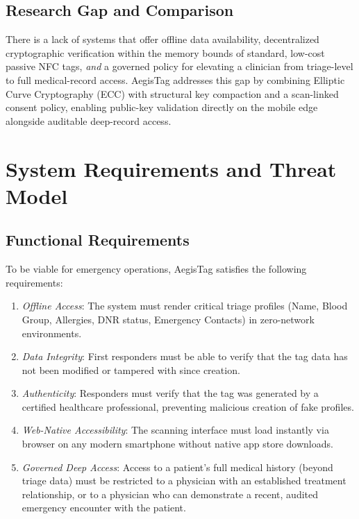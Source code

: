 \documentclass[conference]{IEEEtran}
\begin{document}
\subsection{Research Gap and Comparison}
There is a lack of systems that offer offline data availability, decentralized cryptographic verification within the memory bounds of standard, low-cost passive NFC tags, \textit{and} a governed policy for elevating a clinician from triage-level to full medical-record access. AegisTag addresses this gap by combining Elliptic Curve Cryptography (ECC) with structural key compaction and a scan-linked consent policy, enabling public-key validation directly on the mobile edge alongside auditable deep-record access.

\section{System Requirements and Threat Model}
\subsection{Functional Requirements}
To be viable for emergency operations, AegisTag satisfies the following requirements:
\begin{enumerate}
\item \textit{Offline Access}: The system must render critical triage profiles (Name, Blood Group, Allergies, DNR status, Emergency Contacts) in zero-network environments.
\item \textit{Data Integrity}: First responders must be able to verify that the tag data has not been modified or tampered with since creation.
\item \textit{Authenticity}: Responders must verify that the tag was generated by a certified healthcare professional, preventing malicious creation of fake profiles.
\item \textit{Web-Native Accessibility}: The scanning interface must load instantly via browser on any modern smartphone without native app store downloads.
\item \textit{Governed Deep Access}: Access to a patient's full medical history (beyond triage data) must be restricted to a physician with an established treatment relationship, or to a physician who can demonstrate a recent, audited emergency encounter with the patient.
\end{enumerate}
\end{document}
